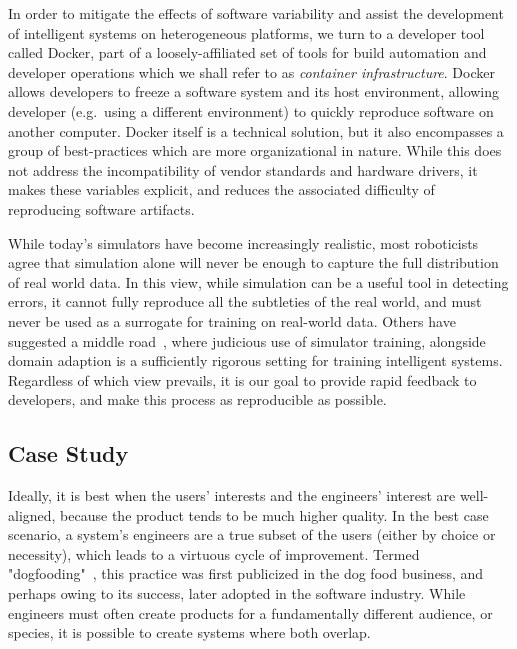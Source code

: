 \documentclass[12pt,initial,twoside,maitrise]{dms}
\numberwithin{equation}{section}
\numberwithin{table}{chapter}
\numberwithin{figure}{chapter}
\begin{document}
In order to mitigate the effects of software variability and assist the development of intelligent systems on heterogeneous platforms, we turn to a developer tool called Docker, part of a loosely-affiliated set of tools for build automation and developer operations which we shall refer to as \textit{container infrastructure}. Docker allows developers to freeze a software system and its host environment, allowing developer (e.g.~using a different environment) to quickly reproduce software on another computer. Docker itself is a technical solution, but it also encompasses a group of best-practices which are more organizational in nature. While this does not address the incompatibility of vendor standards and hardware drivers, it makes these variables explicit, and reduces the associated difficulty of reproducing software artifacts.

While today's simulators have become increasingly realistic, most roboticists agree that simulation alone will never be enough to capture the full distribution of real world data. In this view, while simulation can be a useful tool in detecting errors, it cannot fully reproduce all the subtleties of the real world, and must never be used as a surrogate for training on real-world data. Others have suggested a middle road~\cite{bousmalis2018using}, where judicious use of simulator training, alongside domain adaption is a sufficiently rigorous setting for training intelligent systems. Regardless of which view prevails, it is our goal to provide rapid feedback to developers, and make this process as reproducible as possible.

\subsection{Case Study}\label{subsec:case-study}

Ideally, it is best when the users' interests and the engineers' interest are well-aligned, because the product tends to be much higher quality. In the best case scenario, a system's engineers are a true subset of the users (either by choice or necessity), which leads to a virtuous cycle of improvement. Termed "dogfooding"~\cite{harrison2006eating}, this practice was first publicized in the dog food business, and perhaps owing to its success, later adopted in the software industry. While engineers must often create products for a fundamentally different audience, or species, it is possible to create systems where both overlap.
\end{document}
